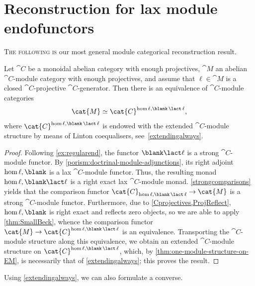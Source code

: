 \section{Reconstruction for lax module endofunctors}\label{sec:lax-module-reconstruction}

\textsc{The following is} our most general module categorical reconstruction result.

\begin{theorem}\label{mainnonsenseprojective}
  Let \(\cat{C}\) be a monoidal abelian category with enough projectives,
  \(\cat{M}\) an abelian \(\cat{C}\)\hyp{}module category with enough projectives,
  and assume that \(\ell \in \cat{M}\) is a closed \(\cat{C}\)\hyp{}projective \(\cat{C}\)\hyp{}generator.
  Then there is an equivalence of \(\cat{C}\)\hyp{}module categories
  \[
    \cat{M} \simeq \cat{C}^{\hom{\ell, \blank \,\lact\, \ell}},
  \]
  where \(\cat{C}^{\hom{\ell, \blank \,\lact\, \ell}}\) is endowed with the extended \(\cat{C}\)\hyp{}module structure
  by means of Linton coequalisers, see~\cref{extendingalways}.
\end{theorem}
\begin{proof}
  Following \cref{ex:regularend}, the functor \(\blank \lact \ell\) is a strong \(\cat{C}\)\hyp{}module functor.
  By \cref{porism:doctrinal-module-adjunctions}, its right adjoint \(\hom{\ell,\blank}\) is a lax \(\cat{C}\)\hyp{}module functor.
  Thus, the resulting monad \(\hom{\ell, \blank \lact \ell}\) is a right exact lax \(\cat{C}\)\hyp{}module monad.
  \cref{strongcomparisons} yields that the comparison functor \(\cat{C}_{\hom{\ell, \blank \,\lact\, \ell}} \to \cat{M}\) is a strong \(\cat{C}\)\hyp{}module functor.
  Furthermore, due to \cref{Cprojectives,ProjReflect}, \(\hom{\ell, \blank}\) is right exact and reflects zero objects,
  so we are able to apply \cref{thm:SmallBeck},
  whence the comparison functor \(\cat{M} \to \cat{C}^{\hom{\ell, \blank \,\lact\, \ell}}\) is an equivalence.
  Transporting the \(\cat{C}\)\hyp{}module structure along this equivalence,
  we obtain an extended \(\cat{C}\)\hyp{}module structure on \(\cat{C}^{\hom{\ell, \blank \,\lact\, \ell}}\),
  which,
  by \cref{thm:one-module-structure-on-EM},
  is necessarily that of \cref{extendingalways};
  this proves the result.
\end{proof}

Using \cref{extendingalways}, we can also formulate a converse.

